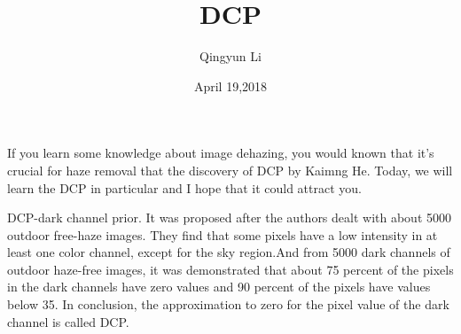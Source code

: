 \documentclass{article}
\author{Qingyun Li}
\date{April 19,2018}
\title{DCP}
\begin{document}
\maketitle
\par If you learn some knowledge about image dehazing, you would known that it's crucial for haze removal that the discovery of DCP by Kaimng He. Today, we will learn the DCP in particular and I hope that it could attract you.
\par DCP-dark channel prior. It was proposed after the authors dealt with about 5000 outdoor free-haze images. They find that some pixels have a low intensity in at least one color channel, except for the sky region.And from 5000 dark channels of outdoor haze-free images, it was demonstrated that about 75 percent of the pixels in the dark channels have zero values and 90 percent of the pixels have values below 35. In conclusion, the approximation to zero for the pixel value of the dark channel is called DCP.
\end{document}
